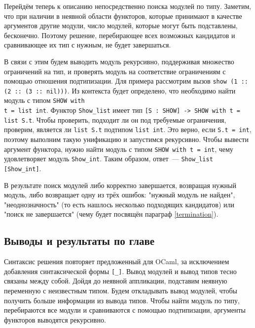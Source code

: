 \documentclass[../diploma.tex]{subfiles}
\begin{document}
Перейдём теперь к описанию непосредственно поиска модулей по типу. Заметим, что при наличии в неявной области функторов, которые принимают в качестве аргументов другие модули, число модулей, которые могут быть подставлены, бесконечно. Поэтому решение, перебирающее всех возможных кандидатов и сравнивающее их тип с нужным, не будет завершаться.

В связи с этим будем выводить модуль рекурсивно, поддерживая множество ограничений на тип, и проверять модуль на соответствие ограничениям с помощью отношения подтипизации. Для примера рассмотрим вызов \texttt{show (1 :: (2 :: (3 :: nil)))}. Из контекста будет определено, что необходимо найти модуль с типом \texttt{SHOW with}\\\texttt{t = list int}. Функтор \texttt{Show_list} имеет тип \texttt{[S : SHOW] -> SHOW with t = list S.t}. Чтобы проверить, подходит ли он под требуемые ограничения, проверим, является ли \texttt{list S.t} подтипом \texttt{list int}. Это верно, если \texttt{S.t = int}, поэтому выполним такую унификацию и запустимся рекурсивно. Чтобы вывести аргумент функтора, нужно найти модуль с типом \texttt{SHOW with t = int}, чему удовлетворяет модуль \texttt{Show_int}. Таким образом, ответ~--- \texttt{Show_list [Show_int]}.

В результате поиск модулей либо корректно завершается, возвращая нужный модуль, либо возвращает одну из трёх ошибок: "нужный модуль не найден", "неоднозначность" (то есть нашлось несколько подходящих кандидатов) или "поиск не завершается" (чему будет посвящён параграф \ref{termination}).

\subsection{Выводы и результаты по главе}

Синтаксис решения повторяет предложенный для OCaml, за исключением добавления синтаксической формы \texttt{[_]}. Вывод модулей и вывод типов тесно связаны между собой. Дойдя до неявной аппликации, подставим неявную переменную с неизвестным типом. Будем откладывать вывод модулей, чтобы получить больше информации из вывода типов. Чтобы найти модуль по типу, перебираются все модули и сравниваются с помощью подтипизации, аргументы функторов выводятся рекурсивно.
\end{document}
